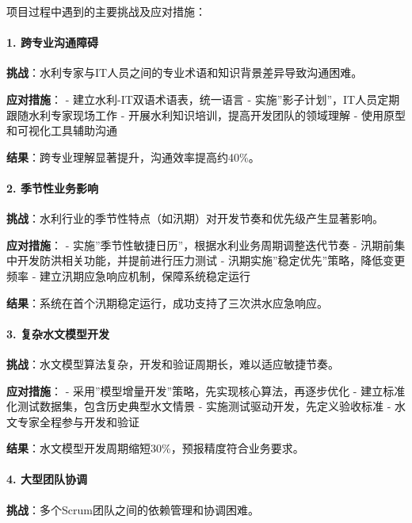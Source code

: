 项目过程中遇到的主要挑战及应对措施：

\paragraph{1.
跨专业沟通障碍}\label{ux8de8ux4e13ux4e1aux6c9fux901aux969cux788d}

\textbf{挑战}：水利专家与IT人员之间的专业术语和知识背景差异导致沟通困难。

\textbf{应对措施}： - 建立水利-IT双语术语表，统一语言 -
实施''影子计划''，IT人员定期跟随水利专家现场工作 -
开展水利知识培训，提高开发团队的领域理解 - 使用原型和可视化工具辅助沟通

\textbf{结果}：跨专业理解显著提升，沟通效率提高约40\%。

\paragraph{2.
季节性业务影响}\label{ux5b63ux8282ux6027ux4e1aux52a1ux5f71ux54cd}

\textbf{挑战}：水利行业的季节性特点（如汛期）对开发节奏和优先级产生显著影响。

\textbf{应对措施}： -
实施''季节性敏捷日历''，根据水利业务周期调整迭代节奏 -
汛期前集中开发防洪相关功能，并提前进行压力测试 -
汛期实施''稳定优先''策略，降低变更频率 -
建立汛期应急响应机制，保障系统稳定运行

\textbf{结果}：系统在首个汛期稳定运行，成功支持了三次洪水应急响应。

\paragraph{3.
复杂水文模型开发}\label{ux590dux6742ux6c34ux6587ux6a21ux578bux5f00ux53d1}

\textbf{挑战}：水文模型算法复杂，开发和验证周期长，难以适应敏捷节奏。

\textbf{应对措施}： -
采用''模型增量开发''策略，先实现核心算法，再逐步优化 -
建立标准化测试数据集，包含历史典型水文情景 -
实施测试驱动开发，先定义验收标准 - 水文专家全程参与开发和验证

\textbf{结果}：水文模型开发周期缩短30\%，预报精度符合业务要求。

\paragraph{4. 大型团队协调}\label{ux5927ux578bux56e2ux961fux534fux8c03}

\textbf{挑战}：多个Scrum团队之间的依赖管理和协调困难。

